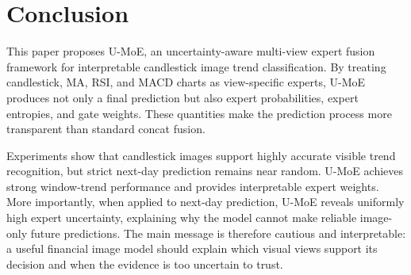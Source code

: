 ﻿\documentclass[conference]{IEEEtran}
\newcommand{\method}{U-MoE}
\begin{document}
\section{Conclusion}
This paper proposes \method{}, an uncertainty-aware multi-view expert fusion framework for interpretable candlestick image trend classification. By treating candlestick, MA, RSI, and MACD charts as view-specific experts, \method{} produces not only a final prediction but also expert probabilities, expert entropies, and gate weights. These quantities make the prediction process more transparent than standard concat fusion.

Experiments show that candlestick images support highly accurate visible trend recognition, but strict next-day prediction remains near random. \method{} achieves strong window-trend performance and provides interpretable expert weights. More importantly, when applied to next-day prediction, \method{} reveals uniformly high expert uncertainty, explaining why the model cannot make reliable image-only future predictions. The main message is therefore cautious and interpretable: a useful financial image model should explain which visual views support its decision and when the evidence is too uncertain to trust.
\end{document}
